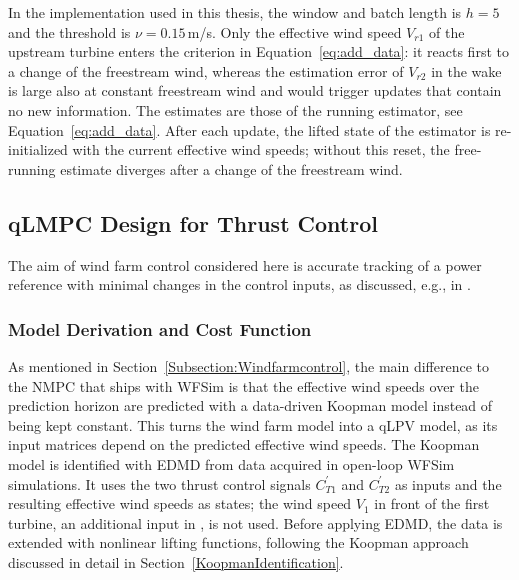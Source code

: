 In the implementation used in this thesis, the window and batch length is $h = 5$ and the threshold is $\nu = 0.15$\,m/s. Only the effective wind speed $V_{r1}$ of the upstream turbine enters the criterion in Equation~\eqref{eq:add_data}: it reacts first to a change of the freestream wind, whereas the estimation error of $V_{r2}$ in the wake is large also at constant freestream wind and would trigger updates that contain no new information. The estimates are those of the running estimator, see Equation~\eqref{eq:add_data}. After each update, the lifted state of the estimator is re-initialized with the current effective wind speeds; without this reset, the free-running estimate diverges after a change of the freestream wind.
\subsection{qLMPC Design for Thrust Control} 
The aim of wind farm control considered here is accurate tracking of a power reference with minimal changes in the control inputs, as discussed, e.g., in \cite{vali2019adjoint, boersma2019constrained}.
\subsubsection{Model Derivation and Cost Function}
As mentioned in Section~\ref{Subsection:Windfarmcontrol}, the main difference to the NMPC that ships with WFSim is that the effective wind speeds over the prediction horizon are predicted with a data-driven Koopman model instead of being kept constant. This turns the wind farm model into a qLPV model, as its input matrices depend on the predicted effective wind speeds. The Koopman model is identified with EDMD from data acquired in open-loop WFSim simulations. It uses the two thrust control signals $C_{T1}^{\prime}$ and $C_{T2}^{\prime}$ as inputs and the resulting effective wind speeds as states; the wind speed $V_1$ in front of the first turbine, an additional input in \cite{dittmer2022data}, is not used. Before applying EDMD, the data is extended with nonlinear lifting functions, following the Koopman approach discussed in detail in Section~\ref{KoopmanIdentification}.

